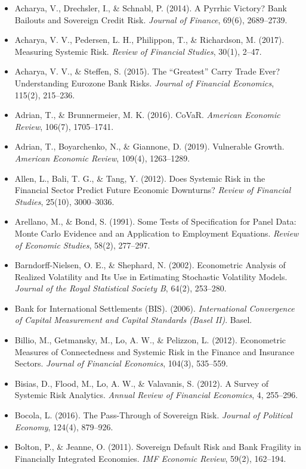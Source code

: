 \documentclass[5p,times,twocolumn,authoryear]{elsarticle}
\begin{document}
\begin{itemize}
    \item Acharya, V., Drechsler, I., \& Schnabl, P. (2014). A Pyrrhic Victory? Bank Bailouts and Sovereign Credit Risk. \textit{Journal of Finance}, 69(6), 2689–2739.
    \item Acharya, V. V., Pedersen, L. H., Philippon, T., \& Richardson, M. (2017). Measuring Systemic Risk. \textit{Review of Financial Studies}, 30(1), 2–47.
    \item Acharya, V. V., \& Steffen, S. (2015). The ``Greatest'' Carry Trade Ever? Understanding Eurozone Bank Risks. \textit{Journal of Financial Economics}, 115(2), 215–236.
    \item Adrian, T., \& Brunnermeier, M. K. (2016). CoVaR. \textit{American Economic Review}, 106(7), 1705–1741.
    \item Adrian, T., Boyarchenko, N., \& Giannone, D. (2019). Vulnerable Growth. \textit{American Economic Review}, 109(4), 1263–1289.
    \item Allen, L., Bali, T. G., \& Tang, Y. (2012). Does Systemic Risk in the Financial Sector Predict Future Economic Downturns? \textit{Review of Financial Studies}, 25(10), 3000–3036.
    \item Arellano, M., \& Bond, S. (1991). Some Tests of Specification for Panel Data: Monte Carlo Evidence and an Application to Employment Equations. \textit{Review of Economic Studies}, 58(2), 277–297.
    \item Barndorff-Nielsen, O. E., \& Shephard, N. (2002). Econometric Analysis of Realized Volatility and Its Use in Estimating Stochastic Volatility Models. \textit{Journal of the Royal Statistical Society B}, 64(2), 253–280.
    \item Bank for International Settlements (BIS). (2006). \textit{International Convergence of Capital Measurement and Capital Standards (Basel II)}. Basel.
    \item Billio, M., Getmansky, M., Lo, A. W., \& Pelizzon, L. (2012). Econometric Measures of Connectedness and Systemic Risk in the Finance and Insurance Sectors. \textit{Journal of Financial Economics}, 104(3), 535–559.
    \item Bisias, D., Flood, M., Lo, A. W., \& Valavanis, S. (2012). A Survey of Systemic Risk Analytics. \textit{Annual Review of Financial Economics}, 4, 255–296.
    \item Bocola, L. (2016). The Pass-Through of Sovereign Risk. \textit{Journal of Political Economy}, 124(4), 879–926.
    \item Bolton, P., \& Jeanne, O. (2011). Sovereign Default Risk and Bank Fragility in Financially Integrated Economies. \textit{IMF Economic Review}, 59(2), 162–194.

\end{itemize}
\end{document}
